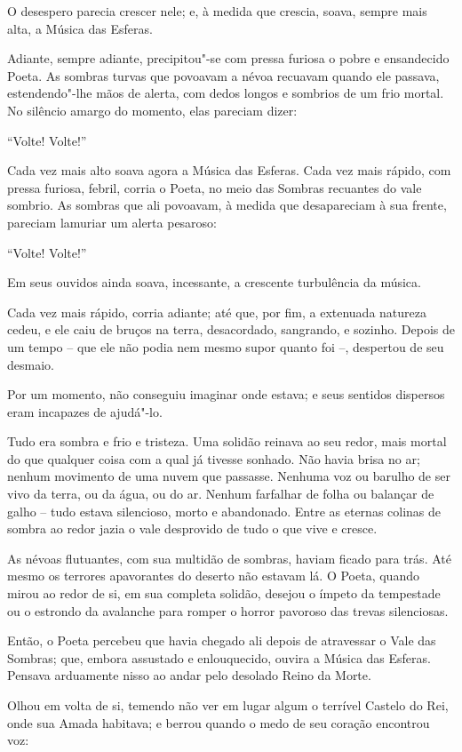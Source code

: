 O desespero parecia crescer nele; e, à medida que crescia, soava, sempre
mais alta, a Música das Esferas.

Adiante, sempre adiante, precipitou"-se com pressa furiosa o pobre e
ensandecido Poeta. As sombras turvas que povoavam a névoa recuavam
quando ele passava, estendendo"-lhe mãos de alerta, com dedos longos e
sombrios de um frio mortal. No silêncio amargo do momento, elas pareciam
dizer:

``Volte! Volte!''

Cada vez mais alto soava agora a Música das Esferas. Cada vez mais
rápido, com pressa furiosa, febril, corria o Poeta, no meio das Sombras
recuantes do vale sombrio. As sombras que ali povoavam, à medida que
desapareciam à sua frente, pareciam lamuriar um alerta pesaroso:

``Volte! Volte!''

Em seus ouvidos ainda soava, incessante, a crescente turbulência da
música.

Cada vez mais rápido, corria adiante; até que, por fim, a extenuada
natureza cedeu, e ele caiu de bruços na terra, desacordado, sangrando, e
sozinho.
\smallskip
Depois de um tempo -- que ele não podia nem mesmo supor quanto foi --,
despertou de seu desmaio.

Por um momento, não conseguiu imaginar onde estava; e seus sentidos
dispersos eram incapazes de ajudá"-lo.

Tudo era sombra e frio e tristeza. Uma solidão reinava ao seu redor,
mais mortal do que qualquer coisa com a qual já tivesse sonhado. Não
havia brisa no ar; nenhum movimento de uma nuvem que passasse. Nenhuma
voz ou barulho de ser vivo da terra, ou da água, ou do ar. Nenhum
farfalhar de folha ou balançar de galho -- tudo estava silencioso,
morto e abandonado. Entre as eternas colinas de sombra ao redor jazia o
vale desprovido de tudo o que vive e cresce.

As névoas flutuantes, com sua multidão de sombras, haviam ficado para
trás. Até mesmo os terrores apavorantes do deserto não estavam lá. O
Poeta, quando mirou ao redor de si, em sua completa solidão, desejou o
ímpeto da tempestade ou o estrondo da avalanche para romper o horror
pavoroso das trevas silenciosas.

Então, o Poeta percebeu que havia chegado ali depois de atravessar o
Vale das Sombras; que, embora assustado e enlouquecido, ouvira a
Música das Esferas. Pensava arduamente nisso ao andar pelo
desolado Reino da Morte.

Olhou em volta de si, temendo não ver em lugar algum o terrível Castelo
do Rei, onde sua Amada habitava; e berrou quando o medo de seu coração
encontrou voz:

